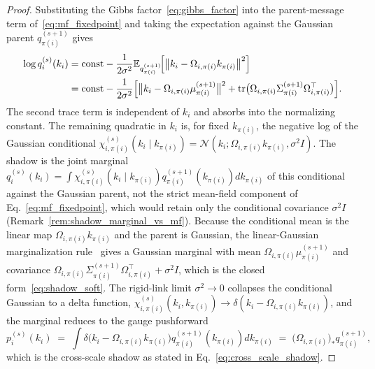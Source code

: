 \documentclass[11pt]{article}
\begin{document}
\begin{proof}
Substituting the Gibbs factor~\eqref{eq:gibbs_factor} into the parent-message term of~\eqref{eq:mf_fixedpoint} and taking the expectation against the Gaussian parent $q_{\pi(i)}^{(s+1)}$ gives
\begin{align}
\log q_i^{(s)}(k_i) &= \text{const} - \frac{1}{2\sigma^2} \mathbb{E}_{q_{\pi(i)}^{(s+1)}}\!\Big[\big\|k_i - \Omega_{i,\pi(i)} k_{\pi(i)}\big\|^2\Big] \notag\\
&= \text{const} - \frac{1}{2\sigma^2}\Big[\big\|k_i - \Omega_{i,\pi(i)}\mu_{\pi(i)}^{(s+1)}\big\|^2 + \operatorname{tr}\!\big(\Omega_{i,\pi(i)}\Sigma_{\pi(i)}^{(s+1)}\Omega_{i,\pi(i)}^\top\big)\Big].
\end{align}
The second trace term is independent of $k_i$ and absorbs into the normalizing constant. The remaining quadratic in $k_i$ is, for fixed $k_{\pi(i)}$, the negative log of the Gaussian conditional $\chi_{i,\pi(i)}^{(s)}(k_i \mid k_{\pi(i)}) = \mathcal{N}(k_i; \Omega_{i,\pi(i)} k_{\pi(i)}, \sigma^2 I)$. The shadow is the joint marginal $q_i^{(s)}(k_i) = \int \chi_{i,\pi(i)}^{(s)}(k_i \mid k_{\pi(i)})  q_{\pi(i)}^{(s+1)}(k_{\pi(i)})  dk_{\pi(i)}$ of this conditional against the Gaussian parent, not the strict mean-field component of Eq.~\eqref{eq:mf_fixedpoint}, which would retain only the conditional covariance $\sigma^2 I$ (Remark~\ref{rem:shadow_marginal_vs_mf}). Because the conditional mean is the linear map $\Omega_{i,\pi(i)} k_{\pi(i)}$ and the parent is Gaussian, the linear-Gaussian marginalization rule~\cite[\S2.3.3]{Bishop2006} gives a Gaussian marginal with mean $\Omega_{i,\pi(i)}\mu_{\pi(i)}^{(s+1)}$ and covariance $\Omega_{i,\pi(i)}\Sigma_{\pi(i)}^{(s+1)}\Omega_{i,\pi(i)}^\top + \sigma^2 I$, which is the closed form~\eqref{eq:shadow_soft}. The rigid-link limit $\sigma^2 \to 0$ collapses the conditional Gaussian to a delta function, $\chi_{i,\pi(i)}^{(s)}(k_i, k_{\pi(i)}) \to \delta(k_i - \Omega_{i,\pi(i)} k_{\pi(i)})$, and the marginal reduces to the gauge pushforward
\begin{equation}
p_i^{(s)}(k_i) \;=\; \int \delta\!\big(k_i - \Omega_{i,\pi(i)} k_{\pi(i)}\big) q_{\pi(i)}^{(s+1)}(k_{\pi(i)})  dk_{\pi(i)} \;=\; \big(\Omega_{i,\pi(i)}\big)_*\! q_{\pi(i)}^{(s+1)},
\end{equation}
which is the cross-scale shadow as stated in Eq.~\eqref{eq:cross_scale_shadow}.
\end{proof}
\end{document}
